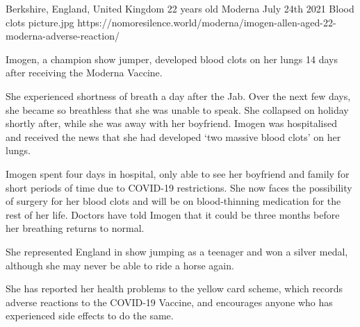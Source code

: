 {Berkshire, England, United Kingdom}
{22 years old}
{Moderna}
{July 24th 2021}
{Blood clots}
{picture.jpg}
{https://nomoresilence.world/moderna/imogen-allen-aged-22-moderna-adverse-reaction/}
{

Imogen, a champion show jumper, developed blood clots on her lungs 14 days after
receiving the Moderna Vaccine.

She experienced shortness of breath a day after the Jab. Over the next few days,
she became so breathless that she was unable to speak. She collapsed on holiday
shortly after, while she was away with her boyfriend. Imogen was hospitalised
and received the news that she had developed ‘two massive blood clots’ on her
lungs.

Imogen spent four days in hospital, only able to see her boyfriend and family
for short periods of time due to COVID-19 restrictions. She now faces the
possibility of surgery for her blood clots and will be on blood-thinning
medication for the rest of her life. Doctors have told Imogen that it could be
three months before her breathing returns to normal.

She represented England in show jumping as a teenager and won a silver medal,
although she may never be able to ride a horse again.

She has reported her health problems to the yellow card scheme, which records
adverse reactions to the COVID-19 Vaccine, and encourages anyone who has
experienced side effects to do the same.

}
